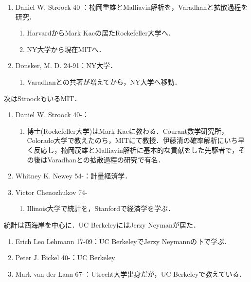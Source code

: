 \documentclass[uplatex,dvipdfmx]{jsreport}
\begin{document}
\begin{history}[U.S.学派]
\begin{enumerate}[({NY}1)]
        \item Daniel W. Stroock 40-：楠岡重雄とMalliavin解析を，Varadhanと拡散過程を研究．
        \begin{enumerate}
            \item HarvardからMark Kacの居たRockefeller大学へ．
            \item NY大学から現在MITへ．
        \end{enumerate}
        \item Donsker, M. D. 24-91：NY大学．
        \begin{enumerate}
            \item Varadhanとの共著が増えてから，NY大学へ移動．
        \end{enumerate}
    \end{enumerate}
    次はStroockもいるMIT．
    \begin{enumerate}[({MIT}1)]
        \item Daniel W. Stroock 40-：
        \begin{enumerate}
            \item 博士(Rockefeller大学)はMark Kacに教わる．Courant数学研究所，Colorado大学で教えたのち，MITにて教授．伊藤清の確率解析にいち早く反応し，楠岡茂雄とMalliavin解析に基本的な貢献をした先駆者で，その後はVaradhanとの拡散過程の研究で有名．
        \end{enumerate}
        \item Whitney K. Newey 54-：計量経済学．
        \item Victor Chenozhukov 74-
        \begin{enumerate}
            \item Illinois大学で統計を，Stanfordで経済学を学ぶ．
        \end{enumerate}
    \end{enumerate}
    統計は西海岸を中心に．UC BerkeleyにはJerzy Neymanが居た．
    \begin{enumerate}[({UCB}1)]
        \item Erich Leo Lehmann 17-09：UC BerkeleyでJerzy Neymannの下で学ぶ．
        \item Peter J. Bickel 40-：UC Berkeley
        \item Mark van der Laan 67-：Utrecht大学出身だが，UC Berkeleyで教えている．
    \end{enumerate}
\end{history}
\end{document}
